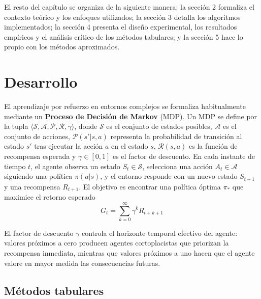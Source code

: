 El resto del capítulo se organiza de la siguiente manera: la sección 2 formaliza el contexto teórico y los enfoques utilizados; la sección 3 detalla los algoritmos implementados; la sección 4 presenta el diseño experimental, los resultados empíricos y el análisis crítico de los métodos tabulares; y la sección 5 hace lo propio con los métodos aproximados.


\section{Desarrollo}

El aprendizaje por refuerzo en entornos complejos se formaliza habitualmente mediante un \textbf{Proceso de Decisión de Markov} (MDP). Un MDP se define por la tupla $\langle \mathcal{S}, \mathcal{A}, \mathcal{P}, \mathcal{R}, \gamma \rangle$, donde $\mathcal{S}$ es el conjunto de estados posibles, $\mathcal{A}$ es el conjunto de acciones, $\mathcal{P}(s'|s,a)$ representa la probabilidad de transición al estado $s'$ tras ejecutar la acción $a$ en el estado $s$, $\mathcal{R}(s,a)$ es la función de recompensa esperada y $\gamma \in [0, 1]$ es el factor de descuento. En cada instante de tiempo $t$, el agente observa un estado $S_t \in \mathcal{S}$, selecciona una acción $A_t \in \mathcal{A}$ siguiendo una política $\pi(a|s)$, y el entorno responde con un nuevo estado $S_{t+1}$ y una recompensa $R_{t+1}$. El objetivo es encontrar una política óptima $\pi_*$ que maximice el retorno esperado $$G_t = \sum_{k=0}^{\infty} \gamma^k R_{t+k+1}$$

El factor de descuento $\gamma$ controla el horizonte temporal efectivo del agente: valores próximos a cero producen agentes cortoplacistas que priorizan la recompensa inmediata, mientras que valores próximos a uno hacen que el agente valore en mayor medida las consecuencias futuras.

\subsection{Métodos tabulares}

